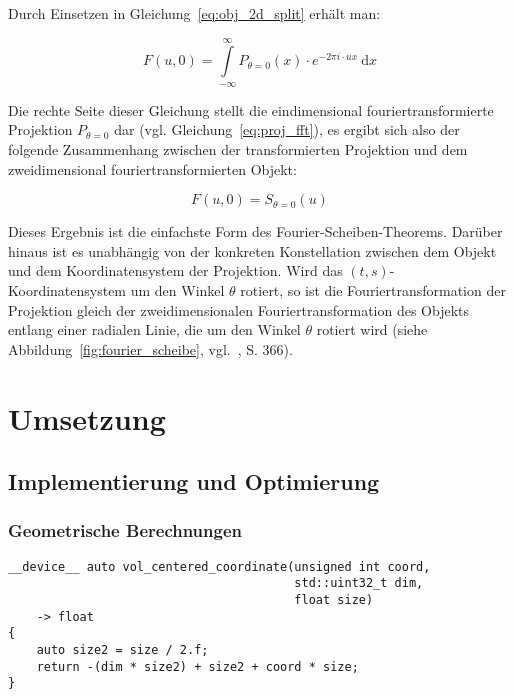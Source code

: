Durch Einsetzen in Gleichung~\ref{eq:obj_2d_split} erhält man:

\begin{equation}
    F(u, 0) = \int\limits_{-\infty}^{\infty} P_{\theta = 0}(x) \cdot e^{-2 \pi i \cdot u x}\ \mathrm{d} x
\end{equation}

Die rechte Seite dieser Gleichung stellt die eindimensional fouriertransformierte Projektion $P_{\theta = 0}$ dar (vgl.
Gleichung~\ref{eq:proj_fft}), es ergibt sich also der folgende Zusammenhang zwischen der transformierten Projektion und
dem zweidimensional fouriertransformierten Objekt:

\begin{equation}
    F(u, 0) = S_{\theta = 0}(u)
\end{equation}

Dieses Ergebnis ist die einfachste Form des Fourier-Scheiben-Theorems. Darüber hinaus ist es unabhängig von der
konkreten Konstellation zwischen dem Objekt und dem Koordinatensystem der Projektion. Wird das
$(t, s)$-Koordinatensystem um den Winkel $\theta$ rotiert, so ist die Fouriertransformation der Projektion gleich der
zweidimensionalen Fouriertransformation des Objekts entlang einer radialen Linie, die um den Winkel $\theta$ rotiert
wird (siehe Abbildung~\ref{fig:fourier_scheibe}, vgl.~\cite{rosenkak}, S. 366).

\chapter{Umsetzung}

\section{Implementierung und Optimierung}

\subsection{Geometrische Berechnungen}

\begin{code}
\begin{verbatim}
__device__ auto vol_centered_coordinate(unsigned int coord,
                                        std::uint32_t dim,
                                        float size)
    -> float
{
    auto size2 = size / 2.f;
    return -(dim * size2) + size2 + coord * size;
}
\end{verbatim}
\label{app:coord_vol}
\end{code}

